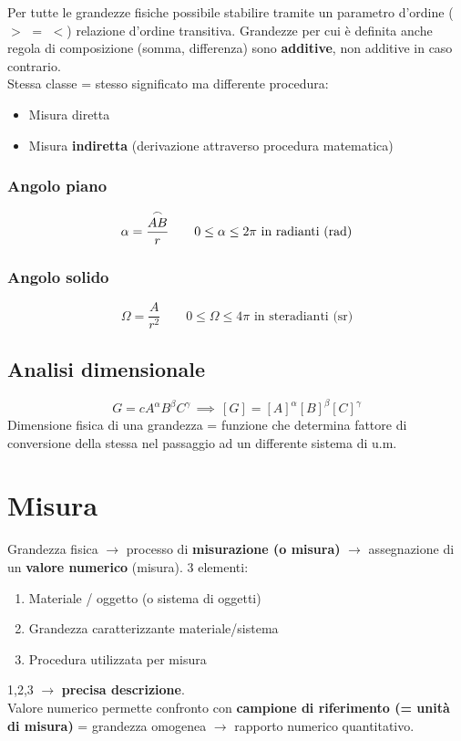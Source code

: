 \documentclass[10pt, oneside]{book}
\begin{document}
Per tutte le grandezze fisiche possibile stabilire tramite un parametro d'ordine ($>$ $=$ $<$) relazione d'ordine transitiva. Grandezze per cui è definita anche regola di composizione (somma, differenza) sono \textbf{additive}, non additive in caso contrario.\\
Stessa classe = stesso significato ma differente procedura:
\begin{itemize}
\item Misura diretta
\item Misura \textbf{indiretta} (derivazione attraverso procedura matematica)
\end{itemize}

\subsubsection*{Angolo piano}
\[\alpha = \frac{\overset{\large\frown}{AB}}{r} \qquad 0 \leq \alpha \leq 2 \pi \textrm{ in radianti (rad)}\]
\subsubsection*{Angolo solido}
\[\Omega = \frac{A}{r^2} \qquad 0 \leq \Omega \leq 4 \pi \textrm{ in steradianti (sr)}\]

\subsection{Analisi dimensionale}
\[G = c A^\alpha B^\beta C^\gamma \, \implies \, [G] = [A]^\alpha [B]^\beta [C]^\gamma\]
Dimensione fisica di una grandezza = funzione che determina fattore di conversione della stessa nel passaggio ad un differente sistema di u.m.


\section{Misura}
Grandezza fisica $\rightarrow$ processo di \textbf{misurazione (o misura)} $\rightarrow$ assegnazione di un \textbf{valore numerico} (misura). 3 elementi:
\begin{enumerate}
\item Materiale / oggetto (o sistema di oggetti)
\item Grandezza caratterizzante materiale/sistema
\item Procedura utilizzata per misura
\end{enumerate}
1,2,3 $\rightarrow$ \textbf{precisa descrizione}.\\
Valore numerico permette confronto con \textbf{campione di riferimento (= unità di misura)} = grandezza omogenea $\rightarrow$ rapporto numerico quantitativo.
\end{document}
